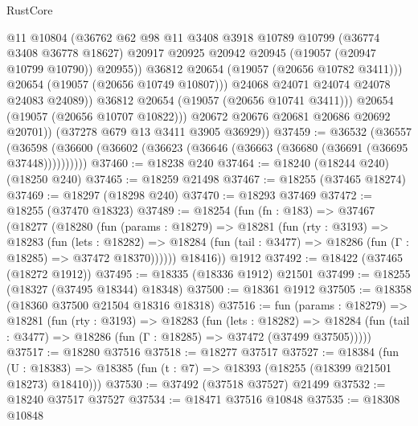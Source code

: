 \begin{lexlean}{RustCore}
\begin{coremodule}
                        @11
                        @10804
                        (@36762
                          @62
                          @98
                          @11
                          @3408
                          @3918
                          @10789
                          @10799
                          (@36774 @3408 @36778 @18627)
                          @20917
                          @20925
                          @20942
                          @20945
                          (@19057 (@20947 @10799 @10790))
                          @20955))
                      @36812
                      @20654
                      (@19057 (@20656 @10782 @3411)))
                    @20654
                    (@19057 (@20656 @10749 @10807)))
                  @24068
                  @24071
                  @24074
                  @24078
                  @24083
                  @24089))
              @36812
              @20654
              (@19057 (@20656 @10741 @3411)))
            @20654
            (@19057 (@20656 @10707 @10822)))
          @20672
          @20676
          @20681
          @20686
          @20692
          @20701))
      (@37278 @679 @13 @3411 @3905 @36929))
@37459 := @36532
    (@36557 (@36598 (@36600 (@36602 (@36623 (@36646 (@36663 (@36680 (@36691 (@36695 @37448))))))))))
@37460 := @18238 @240
@37464 := @18240 (@18244 @240) (@18250 @240)
@37465 := @18259 @21498
@37467 := @18255 (@37465 @18274)
@37469 := @18297 (@18298 @240)
@37470 := @18293 @37469
@37472 := @18255 (@37470 @18323)
@37489 := @18254
    (fun (fn : @183) =>
    @37467
      (@18277
        (@18280
          (fun (params : @18279) =>
          @18281
            (fun (rty : @3193) =>
            @18283
              (fun (lets : @18282) =>
              @18284 (fun (tail : @3477) => @18286 (fun (Γ : @18285) => @37472 @18370))))))
        @18416))
    @1912
@37492 := @18422 (@37465 (@18272 @1912))
@37495 := @18335 (@18336 @1912) @21501
@37499 := @18255 (@18327 (@37495 @18344) @18348)
@37500 := @18361 @1912
@37505 := @18358 (@18360 @37500 @21504 @18316 @18318)
@37516 := fun (params : @18279) =>
  @18281
    (fun (rty : @3193) =>
    @18283
      (fun (lets : @18282) =>
      @18284 (fun (tail : @3477) => @18286 (fun (Γ : @18285) => @37472 (@37499 @37505)))))
@37517 := @18280 @37516
@37518 := @18277 @37517
@37527 := @18384
    (fun (U : @18383) => @18385 (fun (t : @7) => @18393 (@18255 (@18399 @21501 @18273) @18410)))
@37530 := @37492 (@37518 @37527) @21499
@37532 := @18240 @37517 @37527
@37534 := @18471 @37516 @10848
@37535 := @18308 @10848

\end{coremodule}
\end{lexlean}
